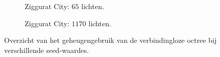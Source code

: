 \begin{figure}[t]
\begin{adjustbox}{minipage=\textwidth, scale=0.55}
    \begin{subfigure}[b]{0.8\textwidth}
      \centering
      \def\svgwidth{\textwidth}
      
      \caption{Ziggurat City: $65$ lichten.}
      \label{fig:hs-seed-memory::zc-low}
    \end{subfigure}
  \end{adjustbox} %
  \begin{adjustbox}{minipage=\textwidth, scale=0.55}
    \begin{subfigure}[b]{0.8\textwidth}
      \centering
      \def\svgwidth{\textwidth}
      
      \caption{Ziggurat City: $1170$ lichten.}
      \label{fig:hs-seed-memory::zc-high}
    \end{subfigure}
  \end{adjustbox}
  \caption{Overzicht van het geheugengebruik van de verbindingloze octree
           bij verschillende seed-waardes.}
  \label{fig:hs-seed-memory}
\end{figure}

